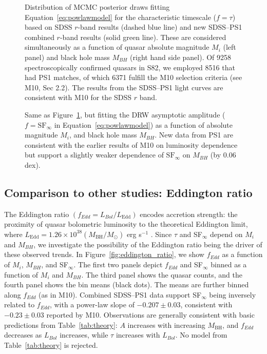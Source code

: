 \documentclass[twocolumn]{aastex62}
\begin{document}
\begin{figure*} 
	\caption{Distribution of MCMC posterior draws fitting Equation~\ref{eq:powlawmodel} for the characteristic timescale ($f=\tau$) based on SDSS $r$-band results (dashed blue line) and new SDSS--PS1 combined $r$-band results (solid green line). These are considered simultaneously as a function of quasar absolute magnitude $M_{i}$ (left panel) and black hole mass $M_{BH}$ (right hand side panel). Of 9258 spectroscopically confirmed quasars in S82, we employed 8516 that had PS1 matches, of which 6371  fulfill the M10 selection criteria (see M10, Sec 2.2). The results from the SDSS--PS1 light curves are consistent with M10 for the SDSS $r$ band. }
	\label{fig:drw_tau_posterior}
\end{figure*} 


\begin{figure*}
	\caption{Same as Figure~\ref{fig:drw_tau_posterior}, but fitting the DRW asymptotic amplitude ($f = \mathrm{SF}_{\infty}$ in Equation~\ref{eq:powlawmodel})  as a function of absolute magnitude $M_{i}$, and black hole mass $M_{BH}$. New data from PS1 are consistent with the earlier results of M10 on luminosity dependence but support a slightly weaker dependence of $\mathrm{SF}_{\infty}$ on $M_{BH}$ (by 0.06 dex).}
	\label{fig:drw_sf_posterior}
\end{figure*} 

 

\subsection{Comparison to other studies: Eddington ratio}

The Eddington ratio $(f_{Edd} {=} L_{Bol}/L_{\mathrm{Edd}})$ encodes accretion strength: the proximity of quasar bolometric luminosity to the theoretical Eddington limit, where $L_{\mathrm{Edd}} {=} 1.26 {\times} 10^{38} (M_{\mathrm{BH}} / M_{\odot})$ erg s$^{-1}$ \citep{shen2011}. Since $\tau$ and SF$_{\infty}$ depend on $M_{i}$ and $M_{BH}$, we investigate the possibility of the Eddington ratio being the driver of these observed trends. In Figure~\ref{fig:eddington_ratio}, we show $f_{Edd} $ as a function of $M_{i}$, $M_{BH}$, and SF$_{\infty}$. The first two panels depict  $f_{Edd} $ and SF$_{\infty}$ binned as a function of $M_{i}$ and $M_{BH}$. The third panel shows the quasar counts, and the fourth panel shows the bin means (black dots). The means are further binned along  $f_{Edd} $ (as in M10). Combined SDSS--PS1 data support SF$_{\infty}$  being inversely related to  $f_{Edd} $, with a power-law slope of $-0.207 \pm 0.03$, consistent with  $-0.23 \pm 0.03$ reported by M10. Observations are generally consistent with basic predictions from Table~\ref{tab:theory}: $A$ increases with increasing  $M_{\mathrm{BH}}$, and  $f_{Edd} $ decreases as $L_{Bol}$ increases, while $\tau$ increases with  $L_{Bol}$. No model from  Table~\ref{tab:theory} is rejected. 
\end{document}
